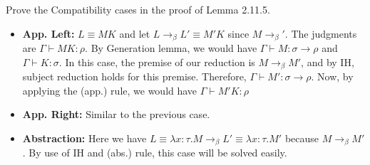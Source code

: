 \begin{problem}{2.18}
     Prove the Compatibility cases in the proof of Lemma 2.11.5.
\end{problem}

\begin{solution}
     \begin{itemize}
          \item \textbf{App. Left:} $L \equiv MK$ and let $L \to_\beta L' \equiv M'K$ since $ M \to_\beta' $.
               The judgments are $\Gamma \vdash MK:\rho$. By Generation lemma, we would have $\Gamma \vdash M : \sigma \to \rho$ and $\Gamma \vdash K : \sigma$.
               In this case, the premise of our reduction is $M \to_\beta M'$, and by IH, subject reduction holds for this premise. Therefore, $\Gamma \vdash M':\sigma \to \rho$.
               Now, by applying the (app.) rule, we would have $\Gamma \vdash M'K:\rho$
          \item \textbf{App. Right:} Similar to the previous case.
          \item \textbf{Abstraction:} Here we have $L \equiv \lambda x:\tau . M \to_\beta L' \equiv \lambda x:\tau .M'$ because $M \to_\beta M'$. By use of IH and (abs.) rule, this case will be solved easily.
     \end{itemize}
\end{solution}